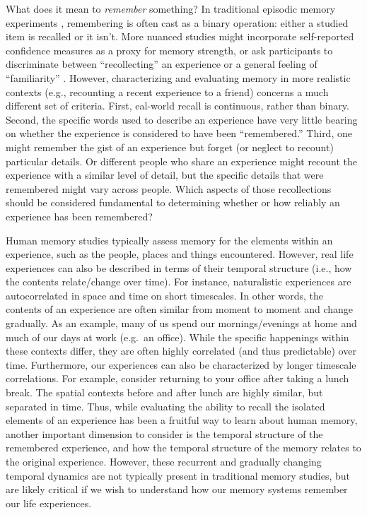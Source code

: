 \documentclass{article}
\begin{document}
What does it mean to \textit{remember} something? In traditional episodic memory experiments \citep[e.g., list-learning or trial-based experiments;][]{Murd62a, Kaha96}, remembering is often cast as a binary operation: either a studied item is recalled or it isn't. More nuanced studies might incorporate self-reported confidence measures as a proxy for memory strength, or ask participants to discriminate between ``recollecting'' an experience or a general feeling of ``familiarity'' \citep{Yone02}. However, characterizing and evaluating memory in more realistic contexts (e.g., recounting a recent experience to a friend) concerns a much different set of criteria.  First, eal-world recall is continuous, rather than binary.  Second, the specific words used to describe an experience have very little bearing on whether the experience is considered to have been ``remembered.''  Third, one might remember the gist of an experience but forget (or neglect to recount) particular details.  Or different people who share an experience might recount the experience with a similar level of detail, but the specific details that were remembered might vary across people.  Which aspects of those recollections should be considered fundamental to determining whether or how reliably an experience has been remembered?


Human memory studies typically assess memory for the elements within an experience, such as the people, places and things encountered. However, real life experiences can also be described in terms of their temporal structure (i.e., how the contents relate/change over time).  For instance, naturalistic experiences are autocorrelated in space and time on short timescales. In other words, the contents of an experience are often similar from moment to moment and change gradually. As an example, many of us spend our mornings/evenings at home and much of our days at work (e.g.\ an office). While the specific happenings within these contexts differ, they are often highly correlated (and thus predictable) over time. Furthermore, our experiences can also be characterized by longer timescale correlations. For example, consider returning to your office after taking a lunch break. The spatial contexts before and after lunch are highly similar, but separated in time. Thus, while evaluating the ability to recall the isolated elements of an experience has been a fruitful way to learn about human memory, another important dimension to consider is the temporal structure of the remembered experience, and how the temporal structure of the memory relates to the original experience. However, these recurrent and gradually changing temporal dynamics are not typically present in traditional memory studies, but are likely critical if we wish to understand how our memory systems remember our life experiences.
\end{document}
